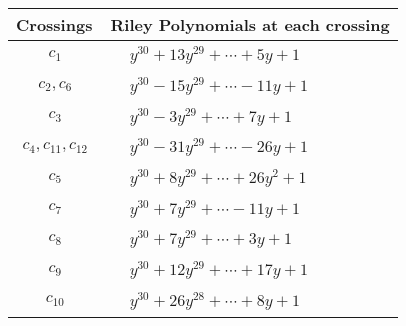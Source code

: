 \documentclass[1p]{elsarticle_modified}
\theoremstyle{definition}
\begin{document}
\begin{tabular}{m{50pt}|m{274pt}}
Crossings & \hspace{64pt}Riley Polynomials at each crossing \\
\hline $$\begin{aligned}c_{1}\end{aligned}$$&$\begin{aligned}
&y^{30}+13 y^{29}+\cdots+5 y+1
\end{aligned}$\\
\hline $$\begin{aligned}c_{2},c_{6}\end{aligned}$$&$\begin{aligned}
&y^{30}-15 y^{29}+\cdots-11 y+1
\end{aligned}$\\
\hline $$\begin{aligned}c_{3}\end{aligned}$$&$\begin{aligned}
&y^{30}-3 y^{29}+\cdots+7 y+1
\end{aligned}$\\
\hline $$\begin{aligned}c_{4},c_{11},c_{12}\end{aligned}$$&$\begin{aligned}
&y^{30}-31 y^{29}+\cdots-26 y+1
\end{aligned}$\\
\hline $$\begin{aligned}c_{5}\end{aligned}$$&$\begin{aligned}
&y^{30}+8 y^{29}+\cdots+26 y^2+1
\end{aligned}$\\
\hline $$\begin{aligned}c_{7}\end{aligned}$$&$\begin{aligned}
&y^{30}+7 y^{29}+\cdots-11 y+1
\end{aligned}$\\
\hline $$\begin{aligned}c_{8}\end{aligned}$$&$\begin{aligned}
&y^{30}+7 y^{29}+\cdots+3 y+1
\end{aligned}$\\
\hline $$\begin{aligned}c_{9}\end{aligned}$$&$\begin{aligned}
&y^{30}+12 y^{29}+\cdots+17 y+1
\end{aligned}$\\
\hline $$\begin{aligned}c_{10}\end{aligned}$$&$\begin{aligned}
&y^{30}+26 y^{28}+\cdots+8 y+1
\end{aligned}$\\
\hline
\end{tabular}\\~\\
\end{document}
